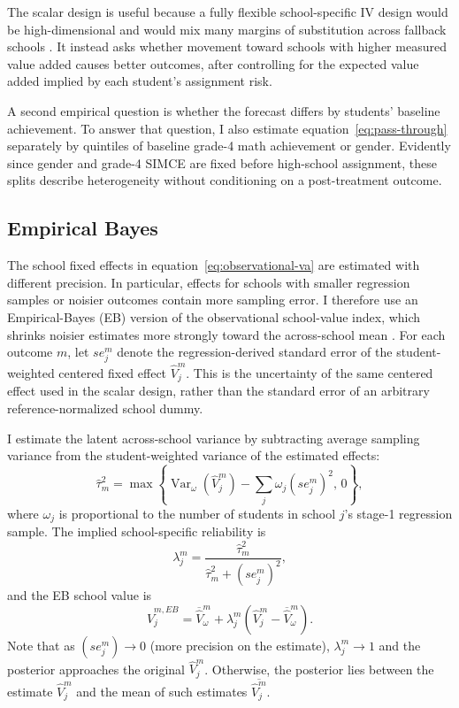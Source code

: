\documentclass[a4paper, article, english, oneside, unknownkeysallowed, 12pt]{memoir}
\begin{document}
The scalar design is useful because a fully flexible school-specific IV design would be high-dimensional and would mix many margins of substitution across fallback schools \parencite{angrist_methods_2023, kirkeboen_field_2016}.
It instead asks whether movement toward schools with higher measured value added causes better outcomes, after controlling for the expected value added implied by each student's assignment risk.

A second empirical question is whether the forecast differs by students' baseline achievement.
To answer that question, I also estimate equation~\eqref{eq:pass-through} separately by quintiles of baseline grade-4 math achievement or gender.
Evidently since gender and grade-4 SIMCE are fixed before high-school assignment, these splits describe heterogeneity without conditioning on a post-treatment outcome.

\subsection{Empirical Bayes}

The school fixed effects in equation~\eqref{eq:observational-va} are estimated with different precision.
In particular, effects for schools with smaller regression samples or noisier outcomes contain more sampling error.
I therefore use an Empirical-Bayes (EB) version of the observational school-value index, which shrinks noisier estimates more strongly toward the across-school mean \parencite{walters_chapter_2024}.
For each outcome $m$, let $se_j^m$ denote the regression-derived standard error of the student-weighted centered fixed effect $\widehat{V}_j^m$.
This is the uncertainty of the same centered effect used in the scalar design, rather than the standard error of an arbitrary reference-normalized school dummy.

I estimate the latent across-school variance by subtracting average sampling variance from the student-weighted variance of the estimated effects:
\begin{equation}
  \widehat{\tau}_m^2 =
  \max\left\{
    \operatorname{Var}_{\omega}\left(\widehat{V}_j^m\right)
    - \sum_j \omega_j (se_j^m)^2,\,
    0
  \right\},
  \label{eq:eb-latent-variance}
\end{equation}
where $\omega_j$ is proportional to the number of students in school $j$'s stage-1 regression sample.
The implied school-specific reliability is
\begin{equation}
  \lambda_j^m =
  \frac{\widehat{\tau}_m^2}
  {\widehat{\tau}_m^2 + (se_j^m)^2},
  \label{eq:eb-reliability}
\end{equation}
and the EB school value is
\begin{equation}
  \widehat{V}_{j}^{m,EB}
  =
  \overline{\widehat{V}}_{\omega}^m
  +
  \lambda_j^m
  \left(
    \widehat{V}_j^m-\overline{\widehat{V}}_{\omega}^m
  \right).
  \label{eq:eb-va}
\end{equation}
Note that as $(se_j^m) \to 0$ (more precision on the estimate), $\lambda^m_j \to 1$ and the posterior approaches the original $\hat{V}_j^m$.
Otherwise, the posterior lies between the estimate $\hat{V}_j^m$ and the mean of such estimates $\overline{\hat{V}_j^m}$.
\end{document}
